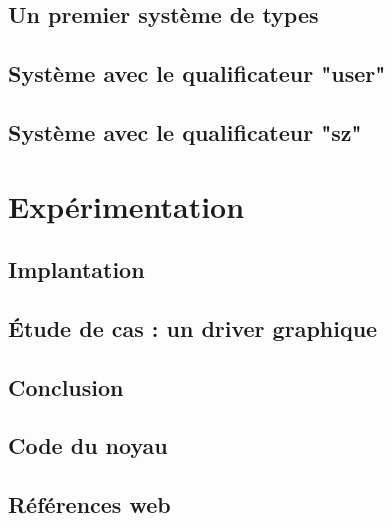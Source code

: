 \documentclass[a4paper,11pt]{memoir}
\begin{document}
\label{cha:lang}


\chapter{Un premier système de types}

\label{cha:typbase}


\chapter{Système avec le qualificateur "user"}

\label{cha:qualuser}


\chapter{Système avec le qualificateur "sz"}



\part{Expérimentation}

\chapter{Implantation}

\label{cha:implem}


\chapter{Étude de cas : un driver graphique}


\chapter{Conclusion}



\appendix

\chapter{Code du noyau}

\label{cha:code-noyau}


\backmatter


\listoftodos

\clearpage

\listoffigures

\chapter{Références web}

\insertlinks



\end{document}
